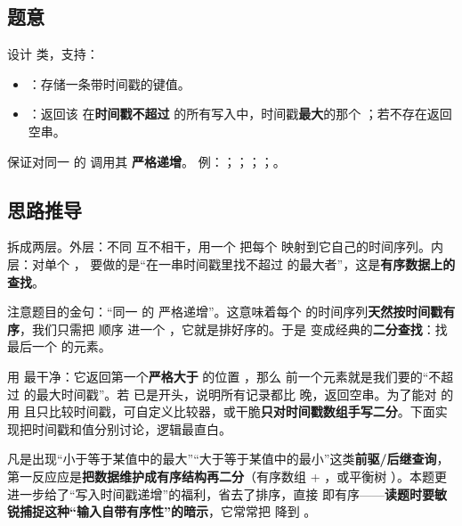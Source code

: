
\subsection*{题意}
设计  类，支持：
\begin{itemize}
  \item {}：存储一条带时间戳的键值。
  \item {}：返回该  在\textbf{时间戳不超过 } 的所有写入中，时间戳\textbf{最大}的那个 ；若不存在返回空串。
\end{itemize}
保证对同一  的  调用其  \textbf{严格递增}。
例：；；；；。

\subsection*{思路推导}
拆成两层。外层：不同  互不相干，用一个  把每个  映射到它自己的时间序列。内层：对单个 ， 要做的是“在一串时间戳里找不超过  的最大者”，这是\textbf{有序数据上的查找}。

注意题目的金句：“同一  的  严格递增”。这意味着每个  的时间序列\textbf{天然按时间戳有序}，我们只需把  顺序  进一个 ，它就是排好序的。于是  变成经典的\textbf{二分查找}：找最后一个  的元素。

用  最干净：它返回第一个\textbf{严格大于}  的位置 ，那么  前一个元素就是我们要的“不超过  的最大时间戳”。若  已是开头，说明所有记录都比  晚，返回空串。为了能对  的  用  且只比较时间戳，可自定义比较器，或干脆\textbf{只对时间戳数组手写二分}。下面实现把时间戳和值分别讨论，逻辑最直白。

\begin{idea}[“最近不超过 X” = 有序结构上的二分（前驱查询）]
凡是出现“小于等于某值中的最大”“大于等于某值中的最小”这类\textbf{前驱/后继查询}，第一反应应是\textbf{把数据维护成有序结构再二分}（有序数组 + ，或平衡树 ）。本题更进一步给了“写入时间戳递增”的福利，省去了排序，直接  即有序——\textbf{读题时要敏锐捕捉这种“输入自带有序性”的暗示}，它常常把  降到 。
\end{idea}

